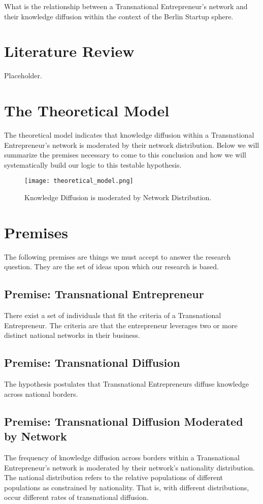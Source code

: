 What is the relationship between a Transnational Entrepreneur's
network and their knowledge diffusion within the context of the Berlin
Startup sphere.

\section{Literature Review}
Placeholder.

\section{The Theoretical Model}
The theoretical model indicates that knowledge diffusion within a
Transnational Entrepreneur's network is moderated by their network
distribution. Below we will summarize the premises necessary to come
to this conclusion and how we will systematically build our logic to
this testable hypothesis.

\begin{figure}[!ht]
  \centering
  \texttt{[image: theoretical\_model.png]}
  \caption{Knowledge Diffusion is moderated by Network Distribution.}
\end{figure}

\section{Premises}
The following premises are things we must accept to answer the
research question. They are the set of ideas upon which our research
is based.

\subsection{Premise: Transnational Entrepreneur}
There exist a set of individuals that fit the criteria of a
Transnational Entrepreneur. The criteria are that the entrepreneur
leverages two or more distinct national networks in their business.

\subsection{Premise: Transnational Diffusion}
The hypothesis postulates that Transnational Entrepreneurs diffuse
knowledge across national borders.

\subsection{Premise: Transnational Diffusion Moderated by Network}
The frequency of knowledge diffusion across borders within a
Transnational Entrepreneur's network is moderated by their network's
nationality distribution. The national distribution refers to the
relative populations of different populations as constrained by
nationality. That is, with different distributions, occur different
rates of transnational diffusion.

